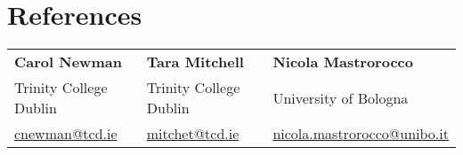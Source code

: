 \documentclass{resume}
\begin{document}
\section{References}
\begin{tabular}{l l l}
        {\bf Carol Newman} & {\bf Tara Mitchell} & {\bf Nicola Mastrorocco} \\[.5\smallskipamount]
        Trinity College Dublin &  Trinity College Dublin & University of Bologna \\ 
        {\href{mailto://cnewman@tcd.ie}{cnewman@tcd.ie}} & {\href{mailto://mitchet@tcd.ie}{mitchet@tcd.ie}} & {\href{mailto://nicola.mastrorocco@unibo.it }{nicola.mastrorocco@unibo.it }} \\
\end{tabular}
\end{document}
